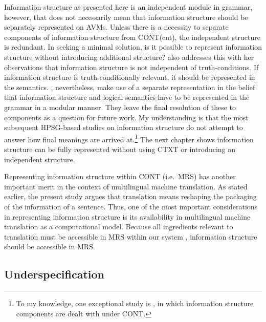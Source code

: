 Information structure as presented here is an independent module in
grammar, however, that does not necessarily mean that information
structure should be separately represented on AVMs. Unless there is a
necessity to separate components of information structure from
CONT(ent), the independent structure is redundant.  In seeking a
minimal solution, is it possible to represent information structure
without introducing additional structure?  \citet{partee:91} also
addresses this with her observations that information structure is not
independent of truth-conditions. If information
structure is truth-conditionally relevant, it should be represented in
the semantics.  \citet{engdahl:vallduvi:96}, nevertheless, make use of
a separate representation in the belief that information structure and
logical semantics have to be represented in the grammar in a modular
manner. They leave the final resolution of these to components as a
question for future work. My understanding is that the most
subsequent HPSG-based studies on information structure do not attempt
to answer how final meanings are arrived at.\footnote{To my knowledge,
  one exceptional study is \citet{webelhuth:07}, in which information
  structure components are dealt with under CONT.}  The next chapter
shows information structure can be fully represented without using
CTXT or introducing an independent structure.




Representing information structure within CONT (i.e.\ MRS) has
another important merit in the context of multilingual machine
translation. As stated earlier, the present study argues that
translation means reshaping the packaging of the information of a
sentence.  Thus, one of the most important considerations in
representing information structure is its availability in multilingual
machine translation as a computational model. Because all ingredients
relevant to translation must be accessible in MRS within our
 system \citep{oepen:etal:07}, information
structure should be accessible in MRS.




\subsection{Underspecification}
\label{8:ssec:underspecification}


